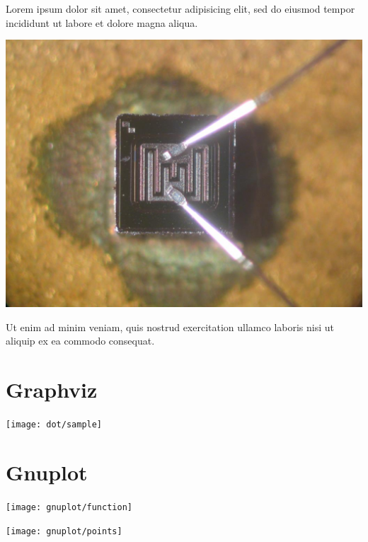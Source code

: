 {
Lorem ipsum dolor sit amet, consectetur adipisicing elit, sed do eiusmod tempor incididunt ut labore et dolore magna aliqua.

\begin{center}
\includegraphics[scale=0.1]{pic/transistor}
\end{center}

Ut enim ad minim veniam, quis nostrud exercitation ullamco laboris nisi ut aliquip ex ea commodo consequat.
}


\section{Graphviz}


{
\begin{center}
\texttt{[image: dot/sample]}
\end{center}
}


\section{Gnuplot}


{
\begin{center}
\texttt{[image: gnuplot/function]}
\end{center}
}


{
\begin{center}
\texttt{[image: gnuplot/points]}
\end{center}
}
